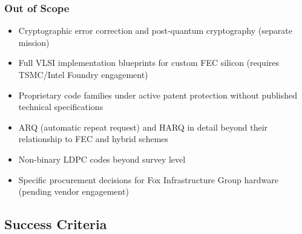 \documentclass[11pt,letterpaper]{article}
\begin{document}
\subsubsection{Out of Scope}

\begin{itemize}[leftmargin=*]
  \item Cryptographic error correction and post-quantum cryptography (separate mission)
  \item Full VLSI implementation blueprints for custom FEC silicon (requires TSMC/Intel Foundry engagement)
  \item Proprietary code families under active patent protection without published technical specifications
  \item ARQ (automatic repeat request) and HARQ in detail beyond their relationship to FEC and hybrid schemes
  \item Non-binary LDPC codes beyond survey level
  \item Specific procurement decisions for Fox Infrastructure Group hardware (pending vendor engagement)
\end{itemize}

\subsection{Success Criteria}
\end{document}

